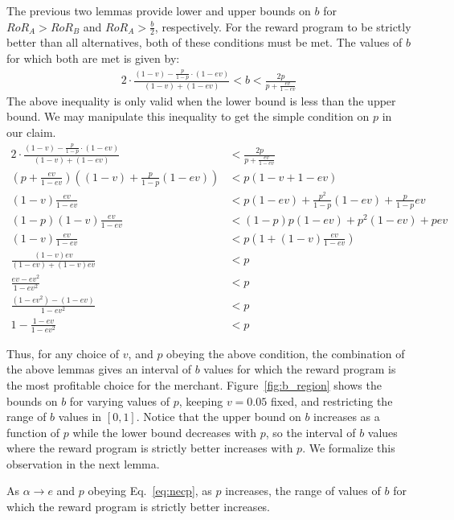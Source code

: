 \proof
The previous two lemmas provide lower and upper bounds on $b$ for $RoR_A > RoR_B$ and $RoR_A > \frac{b}{2}$, respectively. For the reward program to be strictly better than all alternatives, both of these conditions must be met. The values of $b$ for which both are met is given by:
\begin{align*}
2\cdot \frac{(1-v) - \frac{p}{1-p}\cdot (1-ev)}{(1-v) + (1-ev)} < b < \frac{2p}{p+\frac{ev}{1-ev}}
\end{align*}
The above inequality is only valid when the lower bound is less than the upper bound. We may manipulate this inequality to get the simple condition on $p$ in our claim.
\begin{align*}
2\cdot \frac{(1-v) - \frac{p}{1-p}\cdot (1-ev)}{(1-v) + (1-ev)} &< \frac{2p}{p+\frac{ev}{1-ev}} \\
\left(p+\frac{ev}{1-ev} \right)\left((1-v)+\frac{p}{1-p}(1-ev) \right) &<  p(1-v+1-ev) \\
(1-v)\frac{ev}{1-ev} &< p(1-ev)+\frac{p^2}{1-p}(1-ev) + \frac{p}{1-p}ev \\
(1-p)(1-v)\frac{ev}{1-ev} &< (1-p)p(1-ev)+p^2(1-ev)+pev \\
(1-v)\frac{ev}{1-ev} &< p\left(1+(1-v)\frac{ev}{1-ev} \right) \\
\frac{(1-v)ev}{(1-ev)+(1-v)ev} &< p \\
\frac{ev-ev^2}{1-ev^2} &< p \\
\frac{(1-ev^2)-(1-ev)}{1-ev^2} &< p \\
1-\frac{1-ev}{1-ev^2} &< p
\end{align*}
\endproof

Thus, for any choice of $v$, and $p$ obeying the above condition, the combination of the above lemmas gives an interval of $b$ values for which the reward program is the most profitable choice for the merchant. 
Figure~\ref{fig:b_region} shows the bounds on $b$ for varying values of $p$, keeping $v = 0.05$ fixed, and restricting the range of $b$ values in $[0,1]$. 
Notice that the upper bound on $b$ increases as a function of $p$ while the lower bound decreases with $p$, so the interval of $b$ values where the reward program is strictly better increases with $p$. 
We formalize this observation in the next lemma. 

\begin{lemma}
As $\alpha \rightarrow e$ and $p$ obeying Eq.~\ref{eq:necp}, as $p$ increases, the range of values of $b$ for which the reward program is strictly better increases.
\end{lemma}

